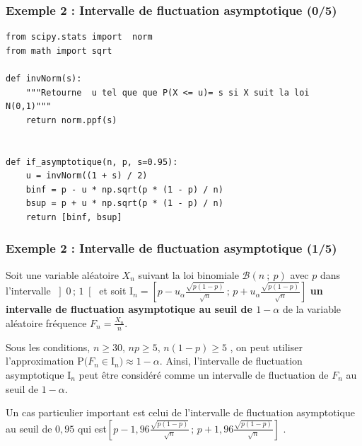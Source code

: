 \documentclass[xcolor=svgnames,t,final]{beamer}
\newcommand{\Interoo}[2]{\left]#1\, ;\, #2\right[}
\newcommand{\Interff}[2]{\left[#1\, ;\, #2\right]}
\newcommand{\loibinom}[2]{\mathcal{B}\left(#1\ ; \ #2 \right)}
\newcommand{\proba}[1]{\text{P}\big(#1\big)}
\begin{document}
\begin{frame}[fragile]

\frametitle{Exemple 2 : Intervalle de fluctuation  asymptotique (0/5)}

\begin{lstlisting}
from scipy.stats import  norm
from math import sqrt

def invNorm(s):
    """Retourne  u tel que que P(X <= u)= s si X suit la loi  N(0,1)"""
    return norm.ppf(s)


def if_asymptotique(n, p, s=0.95):
    u = invNorm((1 + s) / 2)
    binf = p - u * np.sqrt(p * (1 - p) / n)
    bsup = p + u * np.sqrt(p * (1 - p) / n)
    return [binf, bsup]
\end{lstlisting}

\end{frame}




\begin{frame}

\frametitle{Exemple 2 : Intervalle de fluctuation  asymptotique (1/5)}


Soit une  variable aléatoire $X_n$ suivant la loi binomiale $\loibinom{n}{p}$ avec $p$ dans l'intervalle $\Interoo{0}{1}$ et soit  \mbox{$\text{I}_n=\Interff{p-u_{\alpha}\frac{\sqrt{p(1-p)}}{\sqrt{n}}}{p+u_{\alpha}\frac{\sqrt{p(1-p)}}{\sqrt{n}}}$} \textbf{un intervalle de fluctuation \og{} asymptotique au seuil de  $1-\alpha$ \fg{}}  de la variable aléatoire fréquence $F_n=\frac{X_n}{n}$.

Sous les conditions,  $n \geqslant 30, \,   np \geqslant 5, \, n(1-p) \geqslant 5 
$ , on peut utiliser l'approximation $\proba{F_{n} \in \text{I}_n} \approx 1-\alpha$. Ainsi, l'intervalle de fluctuation asymptotique $\text{I}_n$ peut être considéré comme un intervalle de fluctuation de $F_{n}$ au seuil de $1-\alpha$.

\medskip

Un cas particulier important est celui de l'intervalle de fluctuation asymptotique au seuil de $0,95$ qui est\boldmath  $
\Interff{p-1,96\frac{\sqrt{p(1-p)}}{\sqrt{n}}}{p+1,96\frac{\sqrt{p(1-p)}}{\sqrt{n}}}$ \unboldmath.
\end{frame}
\end{document}
